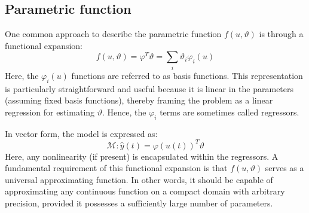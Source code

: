 \subsection{Parametric function}
One common approach to describe the parametric function $f(u,\vartheta)$ is through a functional expansion:
\[f(u,\vartheta)=\varphi^T\vartheta=\sum_i \vartheta_i\varphi_i(u)\]
Here, the $\varphi_i(u)$ functions are referred to as basis functions. 
This representation is particularly straightforward and useful because it is linear in the parameters (assuming fixed basis functions), thereby framing the problem as a linear regression for estimating $\vartheta$.
Hence, the $\varphi_i$ terms are sometimes called regressors.

In vector form, the model is expressed as:
\[\mathcal{M}:\hat{y}(t)=\varphi(u(t))^T\vartheta\]
Here, any nonlinearity (if present) is encapsulated within the regressors. 
A fundamental requirement of this functional expansion is that $f(u,\vartheta)$ serves as a universal approximating function. 
In other words, it should be capable of approximating any continuous function on a compact domain with arbitrary precision, provided it possesses a sufficiently large number of parameters.